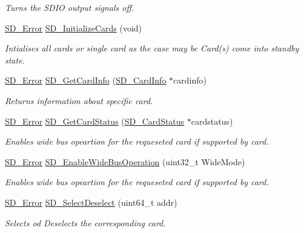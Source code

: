 \begin{DoxyCompactItemize}
\begin{DoxyCompactList}\small\item\em Turns the S\+D\+IO output signals off. \end{DoxyCompactList}\item 
\hyperlink{group__sd__card_gacff91fa68daa1d1ee967b5b3fb3dbd8c}{S\+D\+\_\+\+Error} \hyperlink{group__sd__card_gab39f671413ee824a13bf1bd833f724e9}{S\+D\+\_\+\+Initialize\+Cards} (void)
\begin{DoxyCompactList}\small\item\em Intialises all cards or single card as the case may be Card(s) come into standby state. \end{DoxyCompactList}\item 
\hyperlink{group__sd__card_gacff91fa68daa1d1ee967b5b3fb3dbd8c}{S\+D\+\_\+\+Error} \hyperlink{group__sd__card_ga5348c3c8f17f8c704bf00f1c5e21549d}{S\+D\+\_\+\+Get\+Card\+Info} (\hyperlink{struct_s_d___card_info}{S\+D\+\_\+\+Card\+Info} $\ast$cardinfo)
\begin{DoxyCompactList}\small\item\em Returns information about specific card. \end{DoxyCompactList}\item 
\hyperlink{group__sd__card_gacff91fa68daa1d1ee967b5b3fb3dbd8c}{S\+D\+\_\+\+Error} \hyperlink{group__sd__card_ga858e0742dd01b2e2f6f397d30de6428f}{S\+D\+\_\+\+Get\+Card\+Status} (\hyperlink{struct_s_d___card_status}{S\+D\+\_\+\+Card\+Status} $\ast$cardstatus)
\begin{DoxyCompactList}\small\item\em Enables wide bus opeartion for the requeseted card if supported by card. \end{DoxyCompactList}\item 
\hyperlink{group__sd__card_gacff91fa68daa1d1ee967b5b3fb3dbd8c}{S\+D\+\_\+\+Error} \hyperlink{group__sd__card_ga6569e73a229e639d2043549942d58d11}{S\+D\+\_\+\+Enable\+Wide\+Bus\+Operation} (uint32\+\_\+t Wide\+Mode)
\begin{DoxyCompactList}\small\item\em Enables wide bus opeartion for the requeseted card if supported by card. \end{DoxyCompactList}\item 
\hyperlink{group__sd__card_gacff91fa68daa1d1ee967b5b3fb3dbd8c}{S\+D\+\_\+\+Error} \hyperlink{group__sd__card_ga849eb0b385337453139a7567898dacb7}{S\+D\+\_\+\+Select\+Deselect} (uint64\+\_\+t addr)
\begin{DoxyCompactList}\small\item\em Selects od Deselects the corresponding card. \end{DoxyCompactList}\item 

\end{DoxyCompactItemize}
